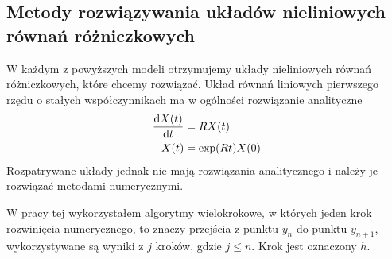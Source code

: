 \documentclass[10pt, a4paper, twoside, onecolumn]{article}
\numberwithin{equation}{section}
\begin{document}
	\subsection{Metody rozwiązywania układów nieliniowych równań różniczkowych}
	W każdym z powyższych modeli otrzymujemy układy nieliniowych równań różniczkowych, które chcemy rozwiązać. 
	Układ równań liniowych pierwszego rzędu o stałych współczynnikach ma w ogólności rozwiązanie analityczne \cite{palczewski}
	\begin{equation}
	\begin{split}
		\dv{X(t)}{t} &= RX(t) \\
		X(t) &= \exp(Rt)X(0)
	\end{split}
	\end{equation}
	Rozpatrywane układy jednak nie mają rozwiązania analitycznego i należy je rozwiązać metodami numerycznymi. \par
	
	W pracy tej wykorzystałem algorytmy wielokrokowe, w których jeden krok rozwinięcia numerycznego, to znaczy przejścia z punktu \(y_{n}\) do punktu \(y_{n+1}\), wykorzystywane są wyniki z \(j\) kroków, gdzie \(j\leq n\). Krok jest oznaczony \(h\). \par
	
\end{document}
